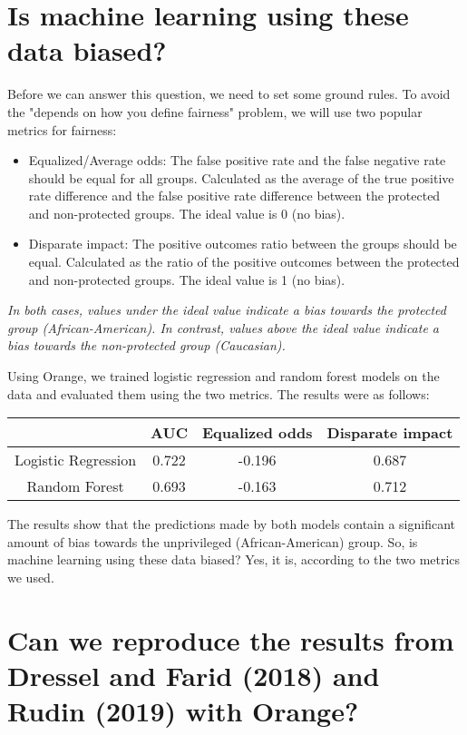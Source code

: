 \documentclass[sigconf,nonacm]{acmart}
\begin{document}
\section{Is machine learning using these data biased?}
Before we can answer this question, we need to set some ground rules. To avoid the "depends on how you define fairness" problem, we will use two popular metrics for fairness:
\begin{itemize}
 \item Equalized/Average odds: The false positive rate and the false negative rate should be equal for all groups. Calculated as the average of the true positive rate difference and the false positive rate difference between the protected and non-protected groups. The ideal value is 0 (no bias).
 \item Disparate impact: The positive outcomes ratio between the groups should be equal. Calculated as the ratio of the positive outcomes between the protected and non-protected groups. The ideal value is 1 (no bias).
\end{itemize}

\textit{\small{In both cases, values under the ideal value indicate a bias towards the protected group (African-American). In contrast, values above the ideal value indicate a bias towards the non-protected group (Caucasian).}}

Using Orange, we trained logistic regression and random forest models on the data and evaluated them using the two metrics. The results were as follows:
\begin{table}[h]
 \centering
 \begin{tabular}{|c|c|c|c|}
 \hline
 & AUC & Equalized odds & Disparate impact \\
 \hline
 Logistic Regression & 0.722 & -0.196 & 0.687 \\
 Random Forest & 0.693 & -0.163 & 0.712 \\
 \hline
 \end{tabular}
 \label{tab:my_label}
\end{table}

The results show that the predictions made by both models contain a significant amount of bias towards the unprivileged (African-American) group. So, is machine learning using these data biased? Yes, it is, according to the two metrics we used.

\section{Can we reproduce the results from Dressel and Farid (2018) and Rudin (2019) with Orange?}
\end{document}
